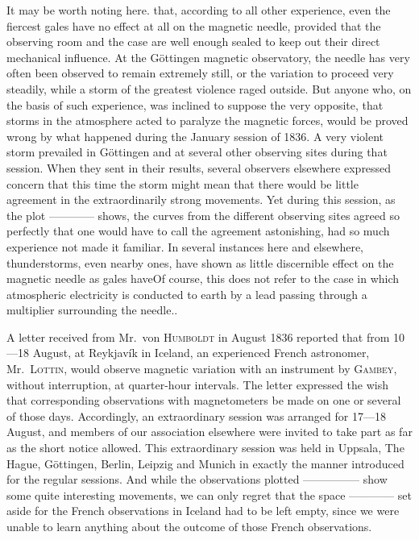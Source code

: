 It may be worth noting here. that, according to all other experience, even the fiercest gales have no effect at all on the magnetic needle, provided that the observing room and the case are well enough sealed to keep out their direct mechanical influence. At the Göttingen magnetic observatory, the needle has very often been observed to remain extremely still, or the variation to proceed very steadily, while a storm of the greatest violence raged outside. But anyone who, on the basis of such experience, was inclined to suppose the very opposite, that storms in the atmosphere acted to paralyze the magnetic forces, would be proved wrong by what happened during the January session of 1836. A very violent storm prevailed in Göttingen and at several other observing sites during that session. When they sent in their results, several observers elsewhere expressed concern that this time the storm might mean that there would be little agreement in the extraordinarily strong movements. Yet during this session, as the plot ---\quad---\quad---\quad--- shows, the curves from the different observing sites agreed so perfectly that one would have to call the agreement astonishing, had so much experience not made it familiar. In several instances here and elsewhere, thunderstorms, even nearby ones, have shown as little discernible effect on the magnetic needle as gales have\expandafter\def\csname HistoricalNoteText575\endcsname{Of course, this does not refer to the case in which atmospheric electricity is conducted to earth by a lead passing through a multiplier surrounding the needle.}.

A letter received from Mr.\ von \textsc{Humboldt} in August 1836 reported that from 10---18 August, at Reykjavík in Iceland, an experienced French astronomer, Mr.\ \textsc{Lottin}, would observe magnetic variation with an instrument by \textsc{Gambey}, without interruption, at quarter-hour intervals. The letter expressed the wish that corresponding observations with magnetometers be
made on one or several of those days. Accordingly, an extraordinary session was arranged for 17---18 August, and members of our association elsewhere were invited to take part as far as the short notice allowed. This extraordinary session was held in Uppsala, The Hague, Göttingen, Berlin, Leipzig and Munich in exactly the manner introduced for the regular sessions. And while the observations plotted ---\quad---\quad---\quad---\quad--- show some quite interesting movements, we can only regret that the space ---\quad---\quad---\quad--- set aside for the French observations in Iceland had to be left empty, since we were unable to learn anything about the outcome of those French observations.

